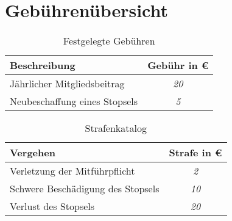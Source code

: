 \section{Gebührenübersicht}
\label{sec:fees}

\newcommand{\svsrEntry}[2]{%
    #1 & \emph{#2} \\
    \hline%
}

\begin{table}[htb]
    \centering
    \begin{tabular}{|l|c|}
        \hline
        \textbf{Beschreibung} & \textbf{Gebühr in \euro} \\
        \hline
        \svsrEntry{Jährlicher Mitgliedsbeitrag}{20}
        \svsrEntry{Neubeschaffung eines Stopsels}{5}
    \end{tabular}
    \caption{Festgelegte Gebühren}
    \label{tab:fees}
\end{table}

\begin{table}[htb]
    \centering
    \begin{tabular}{|l|c|}
        \hline
        \textbf{Vergehen} & \textbf{Strafe in \euro} \\
        \hline
        \svsrEntry{Verletzung der Mitführpflicht}{2}
        \svsrEntry{Schwere Beschädigung des Stopsels}{10}
        \svsrEntry{Verlust des Stopsels}{20}
    \end{tabular}
    \caption{Strafenkatalog}
    \label{tab:penalties}
\end{table}
